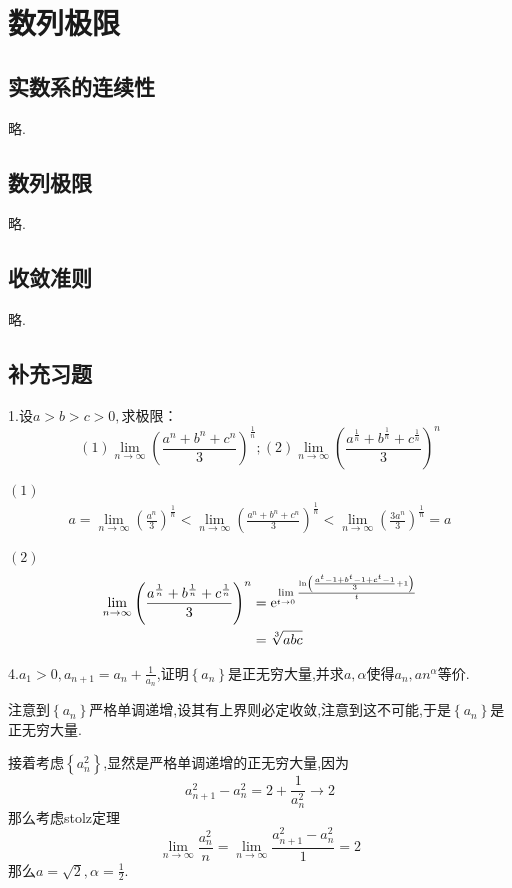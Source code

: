 \chapter{数列极限}
\section{实数系的连续性}
略.
\section{数列极限}
略.
\section{收敛准则}
略.
\section{补充习题}
1.设$a>b>c>0,$求极限：\[
(1)\lim_{n\to\infty}\left(\frac{a^n+b^n+c^n}{3}\right)^{\frac{1}{n}};(2)\lim_{n\to\infty}\left(\frac{a^{\frac{1}{n}}+b^{\frac{1}{n}}+c^{\frac{1}{n}}}{3}\right)^n
\]
\begin{solution}
    $(1)$\begin{align*}
        a=\lim_{n\to\infty}\left(\frac{a^n}{3}\right)^{\frac{1}{n}}<\lim_{n\to\infty}\left(\frac{a^n+b^n+c^n}{3}\right)^{\frac{1}{n}}<\lim_{n\to\infty}\left(\frac{3a^n}{3}\right)^{\frac{1}{n}}=a
    \end{align*}

    $(2)$\begin{align*}
        \lim_{n\to\infty}\left(\frac{a^{\frac{1}{n}}+b^{\frac{1}{n}}+c^{\frac{1}{n}}}{3}\right)^n&=\mathrm{e}^{\lim\limits_{t\to0}\frac{\ln\left(\frac{a^t-1+b^t-1+c^t-1}{3}+1\right)}{t}}\\
        &=\sqrt[3]{abc}
    \end{align*}
\end{solution}

4.$\displaystyle a_1>0,a_{n+1}=a_n+\frac{1}{a_n}$,证明$\left\{a_n\right\}$是正无穷大量,并求$a,\alpha$使得$a_n,an^{\alpha}$等价.
\begin{solution}
    注意到$\left\{a_n\right\}$严格单调递增,设其有上界则必定收敛,注意到这不可能,于是$\left\{a_n\right\}$是正无穷大量.

    接着考虑$\left\{a_n^2\right\}$,显然是严格单调递增的正无穷大量,因为\[
    a_{n+1}^2-a_n^2=2+\frac{1}{a_n^2}\to2
    \]那么考虑\textup{stolz}定理\[
    \lim_{n\to\infty}\frac{a_n^2}{n}=\lim_{n\to\infty}\frac{a_{n+1}^2-a_n^2}{1}=2\]那么$\displaystyle a=\sqrt{2},\alpha=\frac{1}{2}$.
\end{solution}

